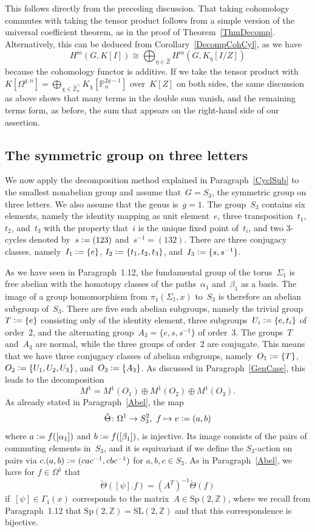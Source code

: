 \documentclass[12pt]{article}
\makeatletter
\theoremstyle{definition}
\theoremstyle{break}
\renewenvironment{proof}[1][\proofname]{\par
\vspace{-5pt}%
\pushQED{\qed}%
\normalfont
\topsep0pt \partopsep0pt %
\trivlist
\item[\hskip\labelsep
\bfseries
#1\@addpunct{.}]\ignorespaces
}{%
\popQED\endtrivlist\@endpefalse
\addvspace{6pt plus 6pt} %
}
\newcommand{\Z}{\mathbb{Z}}
\newcommand{\SL}{\mathrm{SL}}
\newcommand{\Sp}{\mathrm{Sp}}
\renewcommand{\P}{\mathbb{P}}
\renewcommand{\1}{\mathbbm{1}}
\renewcommand{\P}{\mathbb{P}}
\newcommand{\deq}{\vcentcolon =}
\makeatother
\begin{document}
\begin{proof}
This follows directly from the preceding discussion. That taking cohomology commutes with taking the tensor product follows from a simple version of the universal coefficient theorem, as in the proof of Theorem~\ref{ThmDecomp}. Alternatively, this can be deduced from Corollary~\ref{DecompCohCyl}, as we have
\[H^m(G,K[I]) \cong
\bigoplus_{\eta \in \hat{Z}} H^m(G,K_{\eta}[I/Z])\]
because the cohomology functor is additive. If we take the tensor product with
$K[\Omega^{g,n}] = \bigoplus_{\chi \in \hat{\Z}_n^\times} K_\chi[\P_n^{2g-1}]$ over~$K[Z]$ on both sides, the same discussion as above shows that many terms in the double sum vanish, and the remaining terms form, as before, the sum that appears on the right-hand side of our assertion.
\end{proof}


\subsection{The symmetric group on three letters} \label{SymmThree}
We now apply the decomposition method explained in Paragraph~\ref{CyclSub} to the smallest nonabelian group and assume that~$G=S_3$, the symmetric group on three letters. We also assume that the genus is~$g=1$. The group~$S_3$ contains six elements, namely the identity mapping as unit element~$e$, three transposition~$t_1$, $t_2$, and~$t_3$ with the property that~$i$ is the unique fixed point of~$t_i$, and two 3-cycles denoted by~$s \deq (1 2 3)$
and~$s^{-1} = (1 3 2)$. There are three conjugacy classes, namely~$I_1 \deq \{e\}$,
$I_2 \deq \{t_1, t_2, t_3\}$, and~$I_3 \deq \{s,s^{-1}\}$.

As we have seen in Paragraph~1.12, the fundamental group of the torus~$\Sigma_{1}$ is free abelian with the homotopy classes of the paths~$\alpha_1$ and~$\beta_1$ as a basis. The image of a group homomorphism from $\pi_1(\Sigma_{1},x)$ to~$S_3$ is therefore an abelian subgroup of~$S_3$. There are five such abelian subgroups, namely the trivial group~$T \deq \{e\}$ consisting only of the identity element, three subgroups~$U_i \deq \{e,t_i\}$ of order~$2$, and the alternating
group~\mbox{$A_3 = \{e, s , s^{-1}\}$} of order~$3$. The groups~$T$ and~$A_3$ are normal, while the three groups of order~$2$ are conjugate. This means that we have three conjugacy classes of abelian subgroups, namely~$O_1 \deq \{T\}$,~$O_2 \deq \{U_1, U_2, U_3\}$,
and~$O_3 \deq \{A_3\}$. As discussed in Paragraph~\ref{GenCase}, this leads to the decomposition
\[M^1 = M^1(O_1) \oplus M^1(O_2) \oplus M^1(O_3).\]
As already stated in Paragraph~\ref{Abel}, the map
\[\check{\Theta} \colon \Omega^1 \to S_3^2,~f \mapsto v \deq (a,b)\]
where $a \deq f([\alpha_1])$ and $b \deq f([\beta_1])$, is injective. Its image consists of the pairs of commuting elements in~$S_3$, and it is equivariant if we define the \mbox{$S_3$-action} on pairs via $c.(a,b) \deq (cac^{-1}, cbc^{-1})$ for $a,b,c \in S_3$. As in Paragraph~\ref{Abel}, we have for $f \in \Omega^1$ that
\[\check{\Theta}([\psi].f) = (A^T)^{-1} \check{\Theta}(f)\]
if~$[\psi] \in \Gamma_1(x)$ corresponds to the matrix~\mbox{$A \in \Sp(2, \Z)$}, where we recall from Paragraph~1.12 that $\Sp(2, \Z) = \SL(2, \Z)$ and that this correspondence is bijective.
\end{document}
